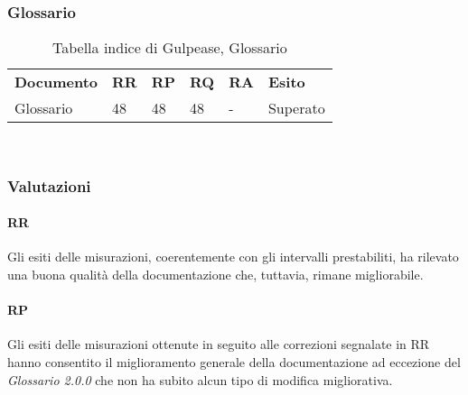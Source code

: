 \subsubsection{Glossario}
\renewcommand{\arraystretch}{2.2}
\begin{longtable}{|C{4.5cm}|C{1.5cm}|C{1.5cm}|C{1.5cm}|C{1.5cm}|C{1.5cm}|}

	\caption{Tabella indice di Gulpease, Glossario}\\
	\hline

	\textbf{Documento} & \textbf{RR}  & \textbf{RP} & \textbf{RQ} & \textbf{RA} & \textbf{Esito}
	\tabularnewline
	\endfirsthead

	Glossario & 48  & 48 & 48 & - & Superato \\
\end{longtable}
 \\

\newpage
\subsubsection{Valutazioni}
\paragraph{RR}
Gli esiti  delle misurazioni, coerentemente con gli intervalli prestabiliti, ha rilevato una buona qualità della documentazione che, tuttavia, rimane migliorabile.

\paragraph{RP}
Gli esiti delle misurazioni ottenute in seguito alle correzioni segnalate in RR hanno consentito il miglioramento generale della documentazione ad eccezione del \textit{Glossario 2.0.0} che non ha subito alcun tipo di modifica migliorativa.\\

